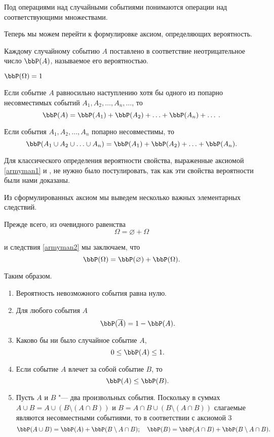 Под операциями над случайными событиями понимаются операции над соответствующими множествами. 

Теперь мы можем перейти к формулировке аксиом, определяющих вероятность.
\begin{axiome} 
Каждому случайному событию $A$ поставлено в соответствие неотрицательное число $\bbP(A)$, называемое его вероятностью.
\end{axiome}
\begin{axiome} \label{armyman1}
$\bbP(\Omega) = 1$
\end{axiome}
\begin{axiome}
 Если событие $A$ равносильно наступлению хотя бы одного из попарно несовместимых событий $A_1,A_2,\ldots,A_n,\ldots$, то
$$
\bbP(A) = \bbP(A_1) + \bbP(A_2) + \ldots + \bbP(A_n) + \ldots \: .
$$
\end{axiome}
\begin{cons}\label{armyman2} 
Если события $A_1,A_2, \ldots, A_n$ попарно несовместимы, то 
$$
\bbP(A_1 \cup A_2 \cup \ldots \cup A_n) = \bbP(A_1) + \bbP(A_2) + \ldots + \bbP(A_n).
$$
\end{cons}
Для классического определения вероятности свойства, выраженные аксиомой \ref{armyman1} и , не нужно было постулировать, так как эти свойства вероятности были нами доказаны.

Из сформулированных аксиом мы выведем несколько важных элементарных следствий.

Прежде всего, из очевидного равенства
$$
\Omega = \varnothing + \Omega
$$

и следствия \ref{armyman2} мы заключаем, что
$$
\bbP(\Omega) = \bbP(\varnothing) + \bbP(\Omega).
$$

Таким образом.
\begin{enumerate}
\item
Вероятность невозможного события равна нулю.
\item	
Для любого события $A$
$$
\bbP(\overline{A}) = 1 - \bbP(A).
$$
\item
Каково бы ни было случайное событие $A$,
$$
0 \le \bbP(A) \le 1.
$$
\item
Если событие $A$ влечет за собой событие $B$, то
$$
\bbP(A) \le \bbP(B).
$$
\item
Пусть $A$ и $B$ "--- два произвольных события. Поскольку в суммах $A \cup B = A \cup (B \setminus (A\cap B))$ и $B = A\cap B \cup (B \setminus (A\cap B))$ слагаемые являются несовместными событиями, то в соответствии с аксиомой 3
$$
\bbP(A \cup B) = \bbP(A) + \bbP(B \setminus A\cap B);\quad \bbP(B) = \bbP(A\cap B) + \bbP(B \setminus A\cap B).
$$
\end{enumerate}

